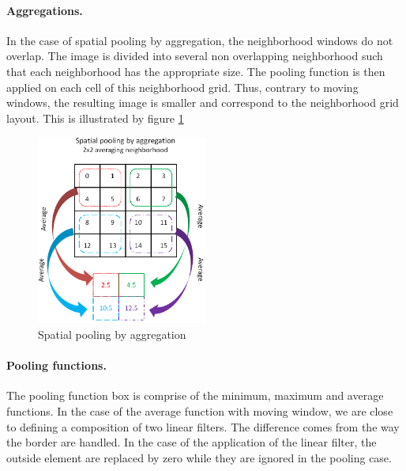 \documentclass[a4paper]{report}
\begin{document}
			\paragraph{Aggregations.}
			In the case of spatial pooling by aggregation, the neighborhood windows do not overlap. The image is divided into several non overlapping neighborhood such that each neighborhood has the appropriate size. The pooling function is then applied on each cell of this neighborhood grid. Thus, contrary to moving windows, the resulting image is smaller and correspond to the neighborhood grid layout. This is illustrated by figure \ref{fig:PoolAgg}
	\begin{figure}
		\centering
			\includegraphics[width=0.5\textwidth]{images/PoolAgg.png}
		\caption{\label{fig:PoolAgg}Spatial pooling by aggregation}
	\end{figure}
	
			\paragraph{Pooling functions.}
			The pooling function box is comprise of the minimum, maximum and average functions. In the case of the average function with moving window, we are close to defining a composition of two linear filters. The difference comes from the way the border are handled. In the case of the application of the linear filter, the outside element are replaced by zero while they are ignored in the pooling case.
			
\end{document}

